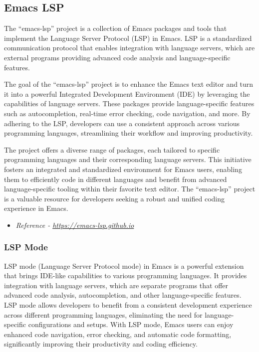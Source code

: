 \documentclass[11pt]{article}
\begin{document}
\subsection{Emacs LSP}
\label{sec:org7471a30}
The ``emacs-lsp'' project is a collection of Emacs packages and tools that implement the Language Server Protocol (LSP) in Emacs. LSP is a standardized communication protocol that enables integration with language servers, which are external programs providing advanced code analysis and language-specific features.

The goal of the ``emacs-lsp'' project is to enhance the Emacs text editor and turn it into a powerful Integrated Development Environment (IDE) by leveraging the capabilities of language servers. These packages provide language-specific features such as autocompletion, real-time error checking, code navigation, and more. By adhering to the LSP, developers can use a consistent approach across various programming languages, streamlining their workflow and improving productivity.

The project offers a diverse range of packages, each tailored to specific programming languages and their corresponding language servers. This initiative fosters an integrated and standardized environment for Emacs users, enabling them to efficiently code in different languages and benefit from advanced language-specific tooling within their favorite text editor. The ``emacs-lsp'' project is a valuable resource for developers seeking a robust and unified coding experience in Emacs.

\begin{itemize}
\item \emph{Reference - \url{https://emacs-lsp.github.io}}
\end{itemize}
\subsubsection{LSP Mode}
\label{sec:org07be8c9}
LSP mode (Language Server Protocol mode) in Emacs is a powerful extension that brings IDE-like capabilities to various programming languages. It provides integration with language servers, which are separate programs that offer advanced code analysis, autocompletion, and other language-specific features. LSP mode allows developers to benefit from a consistent development experience across different programming languages, eliminating the need for language-specific configurations and setups. With LSP mode, Emacs users can enjoy enhanced code navigation, error checking, and automatic code formatting, significantly improving their productivity and coding efficiency.
\end{document}
